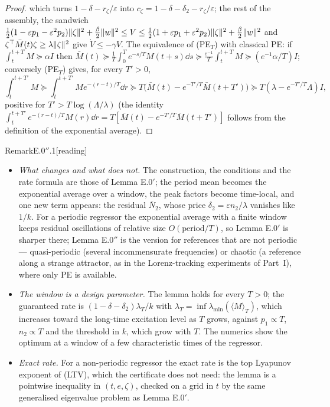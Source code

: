 \begin{proof}
which turns $1-\delta-r_\zeta/\varepsilon$ into $c_\zeta=1-\delta-\delta_2-r_\zeta/\varepsilon$; the rest of the
assembly, the sandwich
$\frac12(1-\varepsilon p_1-\varepsilon^2p_2)\lVert \zeta\rVert^2+\frac\beta2\lVert w\rVert^2\le V\le\frac12(1+\varepsilon p_1+\varepsilon^2p_2)\lVert \zeta\rVert^2+\frac\beta2\lVert w\rVert^2$
and $\zeta^\top\bar M(t)\zeta\ge\lambda\lVert \zeta\rVert^2$ give $\dot V\le-\gamma V$. The equivalence of \textup{(PE$_T$)}
with classical PE: if $\int_t^{t+T}M\succeq\alpha I$ then
$\bar M(t)\succeq\frac1T\int_0^Te^{-s/T}M(t+s)\dd s\succeq\frac{e^{-1}}T\int_t^{t+T}M\succeq(e^{-1}\alpha/T)I$;
conversely \textup{(PE$_T$)} gives, for every $T'>0$,
\[
  \int_t^{t+T'}M\succeq\int_t^{t+T'}Me^{-(r-t)/T}\dd r\succeq T\bigl(\bar M(t)-e^{-T'/T}\bar M(t+T')\bigr)
  \succeq T(\lambda-e^{-T'/T}\Lambda)I,
\]
positive for $T'>T\log(\Lambda/\lambda)$ (the identity
$\int_t^{t+T'}e^{-(r-t)/T}M(r)\dd r=T[\bar M(t)-e^{-T'/T}\bar M(t+T')]$ follows from the definition of the exponential
average).
\end{proof}

\begin{rmk}{Remark}{E.0$''$.1}[reading]\mbox{}
\begin{itemize}
  \item \emph{What changes and what does not.} The construction, the conditions and the rate formula are those of
    Lemma E.0$'$; the period mean becomes the exponential average over a window, the peak factors become time-local,
    and one new term appears: the residual $\bar N_2$, whose price $\delta_2=\varepsilon n_2/\lambda$ vanishes like
    $1/k$. For a periodic regressor the exponential average with a finite window keeps residual oscillations of
    relative size $O(\text{period}/T)$, so Lemma E.0$'$ is sharper there; Lemma E.0$''$ is the version for references
    that are not periodic --- quasi-periodic (several incommensurate frequencies) or chaotic (a reference along a
    strange attractor, as in the Lorenz-tracking experiments of Part~I), where only PE is available.
  \item \emph{The window is a design parameter.} The lemma holds for every $T>0$; the guaranteed rate is
    $(1-\delta-\delta_2)\lambda_T/k$ with $\lambda_T=\inf\lambda_{\min}(\langle M\rangle_T)$, which increases toward
    the long-time excitation level as $T$ grows, against $p_1\propto T$, $n_2\propto T$ and the threshold in $k$,
    which grow with $T$. The numerics show the optimum at a window of a few characteristic times of the regressor.
  \item \emph{Exact rate.} For a non-periodic regressor the exact rate is the top Lyapunov exponent of
    \textup{(LTV)}, which the certificate does not need: the lemma is a pointwise inequality in $(t,e,\zeta)$,
    checked on a grid in $t$ by the same generalised eigenvalue problem as Lemma E.0$'$.
\end{itemize}
\end{rmk}

